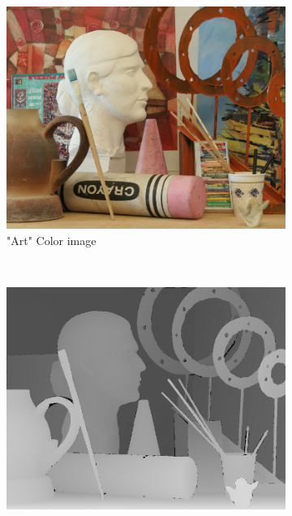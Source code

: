\documentclass[letterpaper, 10 pt, conference]{ieeeconf}  %
\begin{document}
\begin{figure}[t]
        \centering
        \begin{subfigure}[b]{0.3\textwidth}
                \centering
                \includegraphics[width=\textwidth]{imgs/l4.png}
                \caption{"Art" Color image}
                \label{fig:trees}
        \end{subfigure}%
                ~ %
        \begin{subfigure}[b]{0.3\textwidth}
                \centering
                \includegraphics[width=\textwidth]{imgs/disp4.png}

\end{subfigure}
\end{figure}
\end{document}
